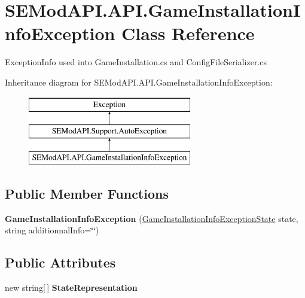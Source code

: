 \hypertarget{class_s_e_mod_a_p_i_1_1_a_p_i_1_1_game_installation_info_exception}{}\section{S\+E\+Mod\+A\+P\+I.\+A\+P\+I.\+Game\+Installation\+Info\+Exception Class Reference}
\label{class_s_e_mod_a_p_i_1_1_a_p_i_1_1_game_installation_info_exception}


Exception\+Info used into Game\+Installation.\+cs and Config\+File\+Serializer.\+cs  


Inheritance diagram for S\+E\+Mod\+A\+P\+I.\+A\+P\+I.\+Game\+Installation\+Info\+Exception\+:\begin{figure}[H]
\begin{center}
\leavevmode
\includegraphics[height=3.000000cm]{class_s_e_mod_a_p_i_1_1_a_p_i_1_1_game_installation_info_exception}
\end{center}
\end{figure}
\subsection*{Public Member Functions}
\begin{DoxyCompactItemize}
\item 
\hypertarget{class_s_e_mod_a_p_i_1_1_a_p_i_1_1_game_installation_info_exception_a451462715027d089d7fd81ed397f5959}{}{\bfseries Game\+Installation\+Info\+Exception} (\hyperlink{namespace_s_e_mod_a_p_i_1_1_a_p_i_a3f4cfe5de907809759771199bcd04878}{Game\+Installation\+Info\+Exception\+State} state, string additionnal\+Info=\char`\"{}\char`\"{})\label{class_s_e_mod_a_p_i_1_1_a_p_i_1_1_game_installation_info_exception_a451462715027d089d7fd81ed397f5959}

\end{DoxyCompactItemize}
\subsection*{Public Attributes}
\begin{DoxyCompactItemize}
\item 
new string\mbox{[}$\,$\mbox{]} {\bfseries State\+Representation}
\end{DoxyCompactItemize}
